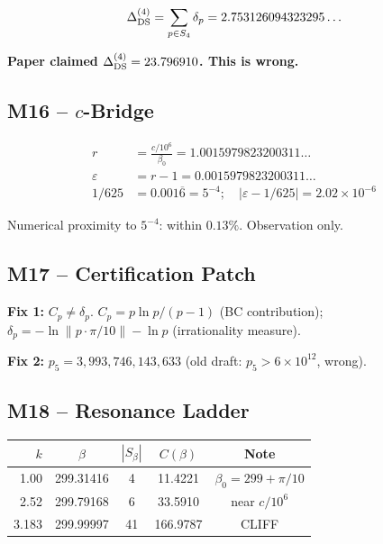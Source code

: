 \documentclass[12pt,letterpaper]{article}
\begin{document}
\begin{equation}
  \Delta_{\rm DS}^{(4)} = \sum_{p \in S_4} \delta_p
  = 2.753126094323295\ldots
  \label{eq:DeltaDS_correct}
\end{equation}

\textbf{Paper claimed $\Delta_{\rm DS}^{(4)} = 23.796910$. This is wrong.}

\subsection{M16 -- $c$-Bridge}

\begin{align}
  r &= \frac{c/10^6}{\beta_0} = 1.0015979823200311\ldots \\
  \varepsilon &= r - 1 = 0.0015979823200311\ldots \\
  1/625 &= 0.001\overline{6} = 5^{-4};\quad
  |\varepsilon - 1/625| = 2.02 \times 10^{-6}
\end{align}

Numerical proximity to $5^{-4}$: within $0.13\%$. Observation only.

\subsection{M17 -- Certification Patch}

\textbf{Fix 1:} $C_p \neq \delta_p$.
$C_p = p\ln p/(p-1)$ (BC contribution);
$\delta_p = -\ln\|p\cdot\pi/10\| - \ln p$ (irrationality measure).

\textbf{Fix 2:} $p_5 = 3{,}993{,}746{,}143{,}633$
(old draft: $p_5 > 6\times10^{12}$, wrong).

\subsection{M18 -- Resonance Ladder}

\begin{center}
\begin{tabular}{rcccc}
\toprule
$k$ & $\beta$ & $|S_\beta|$ & $C(\beta)$ & Note \\
\midrule
1.00 & 299.31416 & 4 & 11.4221 & $\beta_0 = 299+\pi/10$ \\
2.52 & 299.79168 & 6 & 33.5910 & near $c/10^6$ \\
3.183 & 299.99997 & 41 & 166.9787 & CLIFF \\
\bottomrule
\end{tabular}
\end{center}
\end{document}

